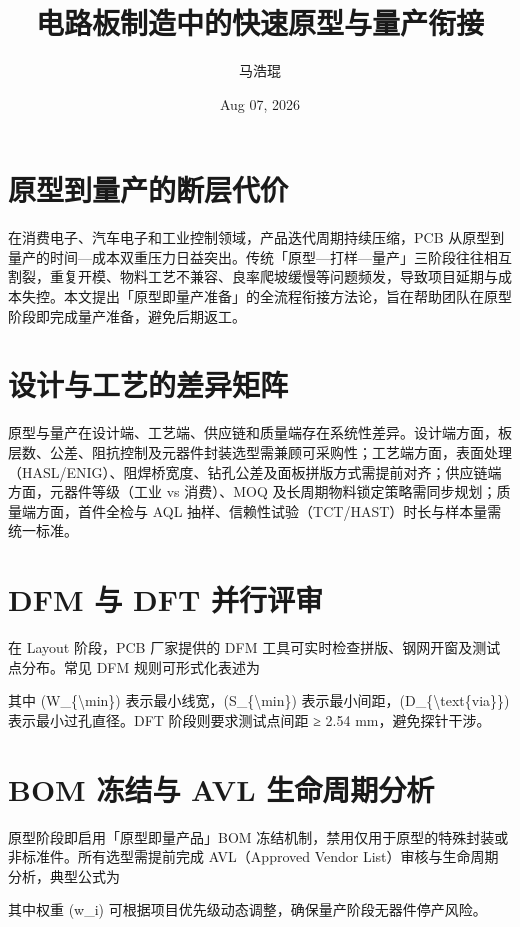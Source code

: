 \title{电路板制造中的快速原型与量产衔接}
\author{马浩琨}
\date{Aug 07, 2026}
\maketitle
\chapter{原型到量产的断层代价}
在消费电子、汽车电子和工业控制领域，产品迭代周期持续压缩，PCB 从原型到量产的时间—成本双重压力日益突出。传统「原型—打样—量产」三阶段往往相互割裂，重复开模、物料工艺不兼容、良率爬坡缓慢等问题频发，导致项目延期与成本失控。本文提出「原型即量产准备」的全流程衔接方法论，旨在帮助团队在原型阶段即完成量产准备，避免后期返工。\par
\chapter{设计与工艺的差异矩阵}
原型与量产在设计端、工艺端、供应链和质量端存在系统性差异。设计端方面，板层数、公差、阻抗控制及元器件封装选型需兼顾可采购性；工艺端方面，表面处理（HASL/ENIG）、阻焊桥宽度、钻孔公差及面板拼版方式需提前对齐；供应链端方面，元器件等级（工业 vs 消费）、MOQ 及长周期物料锁定策略需同步规划；质量端方面，首件全检与 AQL 抽样、信赖性试验（TCT/HAST）时长与样本量需统一标准。\par
\chapter{DFM 与 DFT 并行评审}
在 Layout 阶段，PCB 厂家提供的 DFM 工具可实时检查拼版、钢网开窗及测试点分布。常见 DFM 规则可形式化表述为\par
[
W\_{}\{{}\textbackslash{}min\}{} \textbackslash{}ge 0.1,\textbackslash{}text\{{}mm\}{},\textbackslash{}quad S\_{}\{{}\textbackslash{}min\}{} \textbackslash{}ge 0.1,\textbackslash{}text\{{}mm\}{},\textbackslash{}quad D\_{}\{{}\textbackslash{}text\{{}via\}{}\}{} \textbackslash{}ge 0.2,\textbackslash{}text\{{}mm\}{}
]\par
其中 (W\_{}\{{}\textbackslash{}min\}{}) 表示最小线宽，(S\_{}\{{}\textbackslash{}min\}{}) 表示最小间距，(D\_{}\{{}\textbackslash{}text\{{}via\}{}\}{}) 表示最小过孔直径。DFT 阶段则要求测试点间距 ≥ 2.54 mm，避免探针干涉。\par
\chapter{BOM 冻结与 AVL 生命周期分析}
原型阶段即启用「原型即量产品」BOM 冻结机制，禁用仅用于原型的特殊封装或非标准件。所有选型需提前完成 AVL（Approved Vendor List）审核与生命周期分析，典型公式为\par
[
\textbackslash{}text\{{}Score\}{}\_{}\{{}\textbackslash{}text\{{}AVL\}{}\}{} = w\_{}1 \textbackslash{}cdot \textbackslash{}text\{{}Quality\}{} + w\_{}2 \textbackslash{}cdot \textbackslash{}text\{{}LeadTime\}{} + w\_{}3 \textbackslash{}cdot \textbackslash{}text\{{}Cost\}{}
]\par
其中权重 (w\_{}i) 可根据项目优先级动态调整，确保量产阶段无器件停产风险。\par
